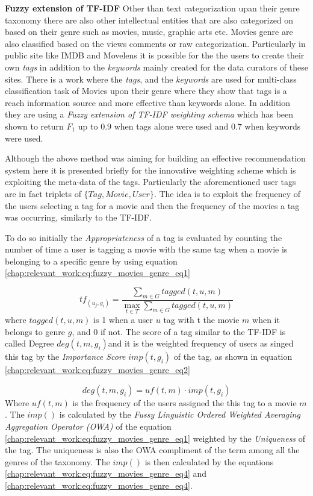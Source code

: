 \textbf{Fuzzy extension of TF-IDF} Other than text categorization upan their genre taxonomy there are also other intellectual entities that are also categorized on based on their genre such as movies, music, graphic arts etc. Movies genre are also classified based on the views comments or raw categorization. Particularly in public site like IMDB and Movelens it is possible for the the users to create their own \textit{tags} in addition to the \textit{keywords} mainly created for the data curators of these sites. There is a work where the \textit{tags}, and the \textit{keywords} are used for multi-class classification task of Movies upon their genre where they show that tags is a reach information source and more effective than keywords alone. In addition they are using a \textit{Fuzzy extension of TF-IDF weighting schema} which has been shown to return $F_{1}$ up to $0.9$ when tags alone were used and $0.7$ when keywords were used.

Although the above method was aiming for building an effective recommendation system here it is presented briefly for the innovative weighting scheme which is exploiting the meta-data of the tags. Particularly the aforementioned user tags are in fact triplets of  $\{Tag, Movie, User \}$. The idea is to exploit the frequency of the users selecting a tag for a movie and then the frequency of the movies a tag was occurring, similarly to the TF-IDF.

To do so initially the \textit{Appropriateness} of a tag is evaluated by counting the number of time a user is tagging a movie with the same tag when a movie is belonging to a specific genre by using equation \ref{chap:relevant_work:eq:fuzzy_movies_genre_eq1}

\begin{equation}\label{chap:relevant_work:eq:fuzzy_movies_genre_eq1}
	tf_(u_{j},g_{i}) = \frac{\sum_{m \in G} tagged(t,u,m) }{ \max_{t \in T} \sum_{m \in G} tagged(t,u,m)}
\end{equation}
where $tagged(t,u,m)$ is 1 when a user $u$ tag with t the movie $m$ when it belongs to genre $g$, and $0$ if not. The score of a tag similar to the TF-IDF is called Degree $deg(t,m,g_{i})$and it is the weighted frequency of users as singed this tag by the \textit{Importance Score} $imp(t,g_{i})$ of the tag, as shown in equation \ref{chap:relevant_work:eq:fuzzy_movies_genre_eq2}

\begin{equation}\label{chap:relevant_work:eq:fuzzy_movies_genre_eq2}
	deg(t,m,g_{i}) = uf(t,m) \cdot imp(t,g_{i})
\end{equation}
Where $uf(t,m)$ is the frequency of the users assigned the this tag to a movie $m$. The $imp()$ is calculated by the \textit{Fussy Linguistic Ordered Weighted Averaging Aggregation Operator (OWA)} of the equation \ref{chap:relevant_work:eq:fuzzy_movies_genre_eq1} weighted by the \textit{Uniqueness} of the tag. The uniqueness is also the OWA compliment of the term among all the genres of the taxonomy. The $imp()$ is then calculated by the equations \ref{chap:relevant_work:eq:fuzzy_movies_genre_eq4} and \ref{chap:relevant_work:eq:fuzzy_movies_genre_eq4}.

